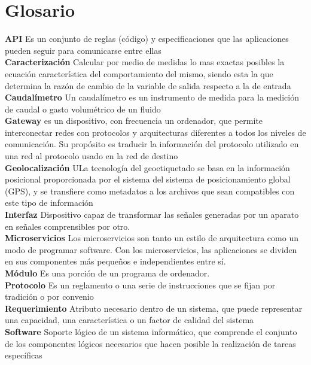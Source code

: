 \chapter{Glosario}\label{chapter9}
\noindent \textbf{API} Es un conjunto de reglas (código) y especificaciones que las aplicaciones pueden seguir para comunicarse entre ellas \citep{API}
\\
\textbf{Caracterización} Calcular por medio de medidas lo mas exactas posibles la ecuación característica del comportamiento del mismo, siendo esta la que determina la razón de cambio de la variable de salida respecto a la de entrada \cite{CARA}
\\
\textbf{Caudalímetro} Un caudalímetro es un instrumento de medida para la medición de caudal o gasto volumétrico de un fluido \citep{MarcoTeorico10}
\\
\textbf{Gateway} es un dispositivo, con frecuencia un ordenador, que permite interconectar redes con protocolos y arquitecturas diferentes a todos los niveles de comunicación. Su propósito es traducir la información del protocolo utilizado en una red al protocolo usado en la red de destino \cite{GATE}
\\
\textbf{Geolocalización} ULa tecnología del geoetiquetado se basa en la información posicional proporcionada por el sistema del sistema de posicionamiento global (GPS), y se transfiere como metadatos a los archivos que sean compatibles con este tipo de información \citep{GEO}
\\
\textbf{Interfaz} Dispositivo capaz de transformar las señales generadas por un aparato en señales comprensibles por otro.\citep{INTERFAZ}
\\
\textbf{Microservicios} Los microservicios son tanto un estilo de arquitectura como un modo de programar software. Con los microservicios, las aplicaciones se dividen en sus componentes más pequeños e independientes entre sí. \citep{MICROSERVICIOS}
\\
\textbf{Módulo} Es una porción de un programa de ordenador. \citep{MODULO}
\\
\textbf{Protocolo} Es un reglamento o una serie de instrucciones que se fijan por tradición o por convenio \citep{PROTOCOLO}
\\
\textbf{Requerimiento} Atributo necesario dentro de un sistema, que puede representar una capacidad, una característica o un factor de calidad del sistema \citep{REQUERIMIENTO}
\\
\textbf{Software} Soporte lógico de un sistema informático, que comprende el conjunto de los componentes lógicos necesarios que hacen posible la realización de tareas específicas\citep{SOFTWARE}


